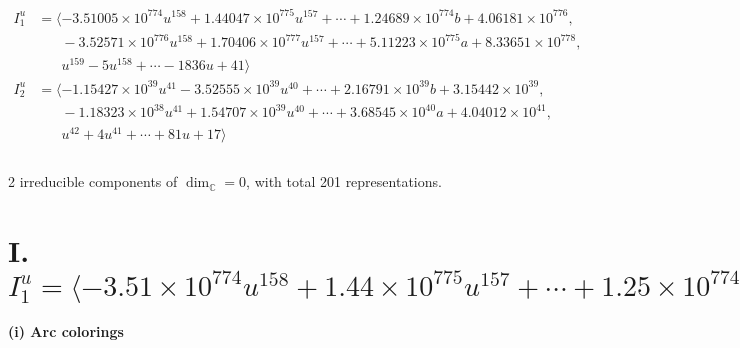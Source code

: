 \documentclass[1p]{elsarticle_modified}
\theoremstyle{definition}
\begin{document}
\begin{align*}
I^u_{1}&=\langle 
-3.51005\times10^{774} u^{158}+1.44047\times10^{775} u^{157}+\cdots+1.24689\times10^{774} b+4.06181\times10^{776},\\
\phantom{I^u_{1}}&\phantom{= \langle  }-3.52571\times10^{776} u^{158}+1.70406\times10^{777} u^{157}+\cdots+5.11223\times10^{775} a+8.33651\times10^{778},\\
\phantom{I^u_{1}}&\phantom{= \langle  }u^{159}-5 u^{158}+\cdots-1836 u+41\rangle \\
I^u_{2}&=\langle 
-1.15427\times10^{39} u^{41}-3.52555\times10^{39} u^{40}+\cdots+2.16791\times10^{39} b+3.15442\times10^{39},\\
\phantom{I^u_{2}}&\phantom{= \langle  }-1.18323\times10^{38} u^{41}+1.54707\times10^{39} u^{40}+\cdots+3.68545\times10^{40} a+4.04012\times10^{41},\\
\phantom{I^u_{2}}&\phantom{= \langle  }u^{42}+4 u^{41}+\cdots+81 u+17\rangle \\
\\
\end{align*}
\raggedright * 2 irreducible components of $\dim_{\mathbb{C}}=0$, with total 201 representations.\\
\newpage
\renewcommand{\arraystretch}{1}
\centering \section*{I. $I^u_{1}= \langle -3.51\times10^{774} u^{158}+1.44\times10^{775} u^{157}+\cdots+1.25\times10^{774} b+4.06\times10^{776},\;-3.53\times10^{776} u^{158}+1.70\times10^{777} u^{157}+\cdots+5.11\times10^{775} a+8.34\times10^{778},\;u^{159}-5 u^{158}+\cdots-1836 u+41 \rangle$}
\flushleft \textbf{(i) Arc colorings}\\
\end{document}
